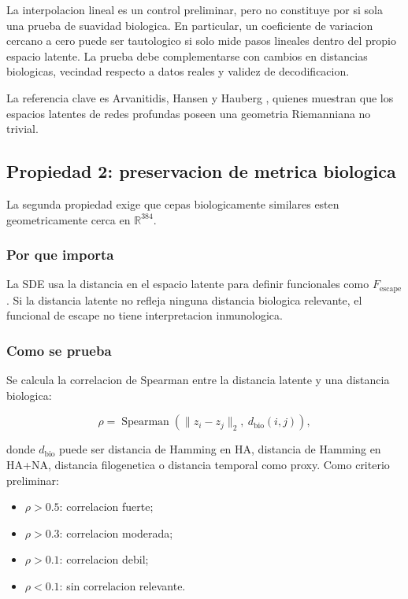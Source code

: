 \documentclass[12pt,letterpaper]{article}
\newcommand{\R}{\mathbb{R}}
\newcommand{\Fescape}{F_{\mathrm{escape}}}
\begin{document}
La interpolacion lineal es un control preliminar, pero no constituye por si sola una prueba de suavidad biologica. En particular, un coeficiente de variacion cercano a cero puede ser tautologico si solo mide pasos lineales dentro del propio espacio latente. La prueba debe complementarse con cambios en distancias biologicas, vecindad respecto a datos reales y validez de decodificacion.

La referencia clave es Arvanitidis, Hansen y Hauberg \cite{arvanitidis2018latent}, quienes muestran que los espacios latentes de redes profundas poseen una geometria Riemanniana no trivial.

\subsection{Propiedad 2: preservacion de metrica biologica}

La segunda propiedad exige que cepas biologicamente similares esten geometricamente cerca en $\R^{384}$.

\subsubsection*{Por que importa}

La SDE usa la distancia en el espacio latente para definir funcionales como $\Fescape$. Si la distancia latente no refleja ninguna distancia biologica relevante, el funcional de escape no tiene interpretacion inmunologica.

\subsubsection*{Como se prueba}

Se calcula la correlacion de Spearman entre la distancia latente y una distancia biologica:

\begin{equation}
    \rho = \operatorname{Spearman}\left(\|z_i-z_j\|_2,\ d_{\mathrm{bio}}(i,j)\right),
\end{equation}

donde $d_{\mathrm{bio}}$ puede ser distancia de Hamming en HA, distancia de Hamming en HA+NA, distancia filogenetica o distancia temporal como proxy. Como criterio preliminar:

\begin{itemize}[leftmargin=2em]
    \item $\rho > 0.5$: correlacion fuerte;
    \item $\rho > 0.3$: correlacion moderada;
    \item $\rho > 0.1$: correlacion debil;
    \item $\rho < 0.1$: sin correlacion relevante.
\end{itemize}
\end{document}
